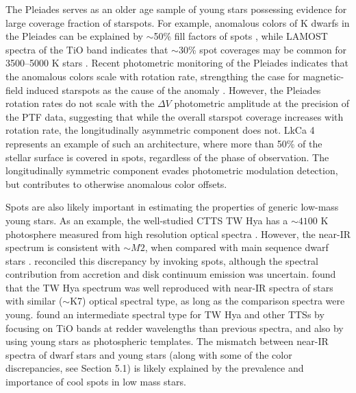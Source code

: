 \documentclass[twocolumn]{emulateapj}%
\begin{document}
The Pleiades serves as an older age sample of young stars possessing evidence for large coverage fraction of starspots.  For example, anomalous colors of K dwarfs in the Pleiades can be explained by $\sim$50\% fill factors of spots \citep{stauffer03}, while LAMOST spectra of the TiO band indicates that $\sim 30$\% spot coverages may be common for 3500--5000 K stars \citep{fang2016}.  Recent photometric monitoring of the Pleiades indicates that the anomalous colors scale with rotation rate, strengthing the case for magnetic-field induced starspots as the cause of the anomaly \citep{covey16}.  However, the \citet{covey16} Pleiades rotation rates do not scale with the $\Delta V$ photometric amplitude at the precision of the PTF data, suggesting that while the overall starspot coverage increases with rotation rate, the longitudinally asymmetric component does not.  LkCa 4 represents an example of such an architecture, where more than 50\% of the stellar surface is covered in spots, regardless of the phase of observation.  The longitudinally symmetric component evades photometric modulation detection, but contributes to otherwise anomalous color offsets.


Spots are also likely important in estimating the properties of generic low-mass young stars. As an example, the well-studied CTTS TW Hya has a $\sim 4100$ K photosphere measured from high resolution optical spectra \citep[e.g.][]{yang05}.  However, the near-IR spectrum is consistent with $\sim M2$, when compared with main sequence dwarf stars \citep{vacca11}.  \citet{debes13} reconciled this discrepancy by invoking spots, although the spectral contribution from accretion and disk continuum emission was uncertain.  \citet{mcclure13} found that the TW Hya spectrum was well reproduced with near-IR spectra of stars with similar ($\sim$K7) optical spectral type, as long as the comparison spectra were young.   \citet{herczeg14} found an intermediate spectral type for TW Hya and other TTSs by focusing on TiO bands at redder wavelengths than previous spectra, and also by using young stars as photospheric templates.  The mismatch between near-IR spectra of dwarf stars and young stars (along with some of the color discrepancies, see Section 5.1) is likely explained by the prevalence and importance of cool spots in low mass stars.


\end{document}
